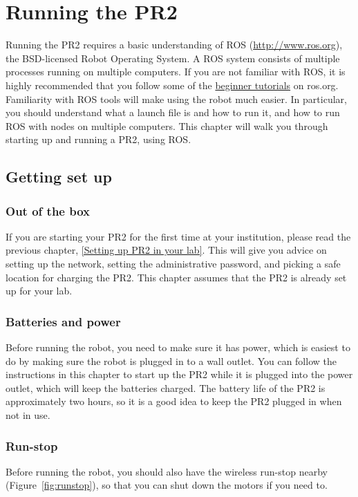 \chapter{Running the PR2}
Running the PR2 requires a basic understanding of ROS (\href{http://www.ros.org}{http://www.ros.org}), the BSD-licensed 
Robot Operating System.  A ROS system consists of multiple processes running on multiple computers.  If you are not 
familiar with ROS, it is highly recommended that you follow some of the \href{http://www.ros.org/wiki/ROS/Tutorials}{beginner tutorials} 
on ros.org. Familiarity with ROS tools will make using the robot much easier.  In particular, you should understand 
what a launch file is and how to run it, and how to run ROS with nodes on multiple computers. This chapter will walk 
you through starting up and running a PR2, using ROS.

\section{Getting set up}
\subsection{Out of the box}
If you are starting your PR2 for the first time at your institution, please read the previous chapter, \ref{Setting up PR2 in your lab}.  
This will give you advice on setting up the network, setting the administrative password, and picking a safe location for 
charging the PR2.  This chapter assumes that the PR2 is already set up for your lab.
\subsection{Batteries and power}
Before running the robot, you need to make sure it has power, which is easiest to do by making sure the robot is plugged in to a wall outlet. You can follow the instructions in this chapter to start up the PR2 while it is plugged into the power outlet, which will keep the batteries charged.  The battery life of the PR2 is approximately two hours, so it is a good idea to keep the PR2 plugged in when not in use.  


\subsection{Run-stop}
Before running the robot, you should also have the wireless run-stop 
nearby (Figure~\ref{fig:runstop}), so that you can shut down the motors if you need to. 

